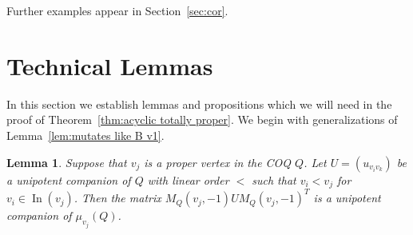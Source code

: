 \documentclass[11pt, letterpaper]{amsart}
\newcommand{\hide}[1]{}
\newtheorem{lemma}[theorem]{Lemma}
\theoremstyle{definition}
\newtheorem{remark}[theorem]{Remark}
\numberwithin{equation}{section}
\def\In{{\operatorname{In}}}
\begin{document}
\hide{\begin{remark}
\label{rem:Schwartz}
Amanda Schwartz has recently developed a combinatorial description for \emph{all} of the coefficients of the Alexander polynomial $\Delta_Q(t)$ in the case that $Q$ is a tree quiver (that is, $K_Q$ is a tree) \cite[Theorem 4.2]{SchwartzTree}.
\end{remark}
}
Further examples appear in Section~\ref{sec:cor}.

\newpage

\section{Technical Lemmas}
\label{sec:tech}

In this section we establish lemmas and propositions which we will need in the proof of Theorem~\ref{thm:acyclic totally proper}.
We begin with generalizations of Lemma~\ref{lem:mutates like B v1}.

\begin{lemma}
\label{lem:mutates like B v1gen}
Suppose that $v_j$ is a proper vertex in the COQ $Q$.
Let $U=(u_{v_i v_k})$ be a unipotent companion of $Q$ with linear order $<$ such that $v_i < v_j$ for $v_i \in \In(v_j)$.
Then the matrix $M_Q(v_j, -1) U M_Q(v_j, -1)^T$ is a unipotent companion of $\mu_{v_j}(Q)$.
\end{lemma}
\end{document}
